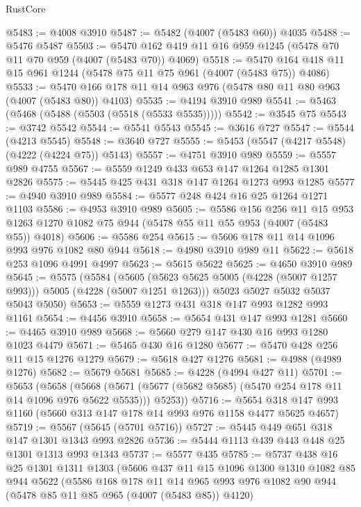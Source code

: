 \begin{lexlean}{RustCore}
\begin{coremodule}
@5483 := @4008 @3910
@5487 := @5482 (@4007 (@5483 @60)) @4035
@5488 := @5476 @5487
@5503 := @5470 @162 @419 @11 @16 @959 @1245 (@5478 @70 @11 @70 @959 (@4007 (@5483 @70)) @4069)
@5518 := @5470 @164 @418 @11 @15 @961 @1244 (@5478 @75 @11 @75 @961 (@4007 (@5483 @75)) @4086)
@5533 := @5470 @166 @178 @11 @14 @963 @976 (@5478 @80 @11 @80 @963 (@4007 (@5483 @80)) @4103)
@5535 := @4194 @3910 @989
@5541 := @5463 (@5468 (@5488 (@5503 (@5518 (@5533 @5535)))))
@5542 := @3545 @75
@5543 := @3742 @5542
@5544 := @5541 @5543
@5545 := @3616 @727
@5547 := @5544 (@4213 @5545)
@5548 := @3640 @727
@5555 := @5453 (@5547 (@4217 @5548) (@4222 (@4224 @75)) @5143)
@5557 := @4751 @3910 @989
@5559 := @5557 @989 @4755
@5567 := @5559 @1249 @433 @653 @147 @1264 @1285 @1301 @2826
@5575 := @5445 @425 @431 @318 @147 @1264 @1273 @993 @1285
@5577 := @4940 @3910 @989
@5584 := @5577 @248 @424 @16 @25 @1264 @1271 @1103
@5586 := @4953 @3910 @989
@5605 := @5586
    @156
    @256
    @11
    @15
    @953
    @1263
    @1270
    @1082
    @75
    @944
    (@5478 @55 @11 @55 @953 (@4007 (@5483 @55)) @4018)
@5606 := @5586 @254
@5615 := @5606 @178 @11 @14 @1096 @993 @976 @1082 @80 @944
@5618 := @4980 @3910 @989 @11
@5622 := @5618 @253 @1096 @4991 @4997
@5623 := @5615 @5622
@5625 := @4650 @3910 @989
@5645 := @5575
    (@5584
      (@5605 (@5623 @5625 @5005 (@4228 (@5007 @1257 @993))) @5005 (@4228 (@5007 @1251 @1263)))
      @5023
      @5027
      @5032
      @5037
      @5043
      @5050)
@5653 := @5559 @1273 @431 @318 @147 @993 @1282 @993 @1161
@5654 := @4456 @3910
@5658 := @5654 @431 @147 @993 @1281
@5660 := @4465 @3910 @989
@5668 := @5660 @279 @147 @430 @16 @993 @1280 @1023 @4479
@5671 := @5465 @430 @16 @1280
@5677 := @5470 @428 @256 @11 @15 @1276 @1279
@5679 := @5618 @427 @1276
@5681 := @4988 (@4989 @1276)
@5682 := @5679 @5681
@5685 := @4228 (@4994 @427 @11)
@5701 := @5653
    (@5658
      (@5668 (@5671 (@5677 (@5682 @5685) (@5470 @254 @178 @11 @14 @1096 @976 @5622 @5535))) @5253))
@5716 := @5654 @318 @147 @993 @1160 (@5660 @313 @147 @178 @14 @993 @976 @1158 @4477 @5625 @4657)
@5719 := @5567 (@5645 (@5701 @5716))
@5727 := @5445 @449 @651 @318 @147 @1301 @1343 @993 @2826
@5736 := @5444 @1113 @439 @443 @448 @25 @1301 @1313 @993 @1343
@5737 := @5577 @435
@5785 := @5737
    @438
    @16
    @25
    @1301
    @1311
    @1303
    (@5606
      @437
      @11
      @15
      @1096
      @1300
      @1310
      @1082
      @85
      @944
      @5622
      (@5586
        @168
        @178
        @11
        @14
        @965
        @993
        @976
        @1082
        @90
        @944
        (@5478 @85 @11 @85 @965 (@4007 (@5483 @85)) @4120)

\end{coremodule}
\end{lexlean}
